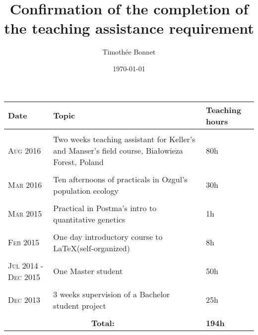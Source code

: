 \documentclass{scrartcl}
\title{Confirmation of the completion of the teaching assistance requirement}
\author{Timoth\'ee Bonnet}
\date{\today}
\begin{document}
\maketitle

\begin{tabular}{p{4cm} p{8cm} p{3cm}}
\toprule
\centering
\hfill Date & Topic & Teaching hours\\
\midrule
\multicolumn{2}{c}{} \\
\hfill \textsc{Aug 2016} & Two weeks teaching assistant for Keller's and Manser's field course, Bia{\l}owie$\dot{\mathrm{z}}$a Forest, Poland & 80h\\
\multicolumn{2}{c}{} \\
\hfill \textsc{Mar 2016} & Ten afternoons of practicals in Ozgul's population ecology & 30h\\
\multicolumn{2}{c}{} \\
\hfill \textsc{Mar 2015} & Practical in Postma's intro to quantitative genetics & 1h\\
\multicolumn{2}{c}{} \\
\hfill \textsc{Feb 2015} & One day introductory course to \LaTeX (self-organized) & 8h \\
\multicolumn{2}{c}{} \\
\hfill \textsc{Jul 2014 - Dec 2015} & One Master student & 50h\\
\multicolumn{2}{c}{} \\
\hfill \textsc{Dec 2013} & 3 weeks supervision of a Bachelor student project & 25h\\
\multicolumn{2}{c}{} \\
\midrule
\multicolumn{2}{c}{\hfill \textbf{Total:}}& \textbf{194h}\\
\bottomrule
\end{tabular}
\end{document}
